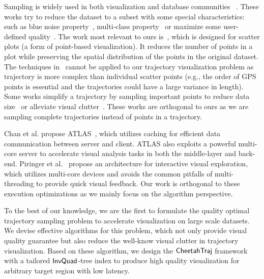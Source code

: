  Sampling is widely used in both visualization and database communities ~\cite{battle2013dynamic,rapp2019void,chen2014visual,yu2020turbocharging,park2016visualization,qin2020making,DBLP:conf/sigmod/DingHCC016,DBLP:journals/pvldb/KimBPIMR15}. These works try to reduce the dataset to a subset with some special characteristics: such as blue noise property~\cite{rapp2019void}, multi-class property~\cite{chen2014visual} or maximize some user-defined quality~\cite{yu2020turbocharging}. The work most relevant to ours is~\cite{park2016visualization}, which is designed for scatter plots (a form of point-based visualization). It reduces the number of points in a plot while preserving the spatial distribution of the points in the original dataset. The techniques in~\cite{park2016visualization} cannot be applied to our trajectory visualization problem
as trajectory is more complex than individual scatter points (e.g., the order of GPS points is essential and the trajectories could have a large variance in length). Some works simplify a trajectory by sampling important points to reduce data size~\cite{zhang2018trajectory,2018arXiv180303550V} or alleviate visual clutter~\cite{borcan2012improving, 6851202}. These works are orthogonal to ours as we are sampling complete trajectories instead of points in a trajectory.



Chan et al. propose ATLAS~\cite{chan2008maintaining}, which utilizes caching for efficient data communication between server and client.
ATLAS also exploits a powerful multi-core server to accelerate visual analysis tasks in both the middle-layer and back-end.
Piringer et al.~\cite{piringer2009multi} propose an architecture for interactive visual exploration,
which utilizes multi-core devices and avoids the common pitfalls of multi-threading to provide quick visual feedback.
Our work is orthogonal to these execution optimizations as we mainly focus on the algorithm perspective.

 To the best of our knowledge, we are the first to formulate the quality optimal trajectory sampling problem to accelerate visualization on large scale datasets. We devise effective algorithms for this problem, which not only provide visual quality guarantee but also reduce the well-know visual clutter in trajectory visualization. Based on these algorithm, we design the $\mathsf{CheetahTraj}$ framework with a tailored $\mathsf{InvQuad}$-tree index to produce high quality visualization for arbitrary target region with low latency.

